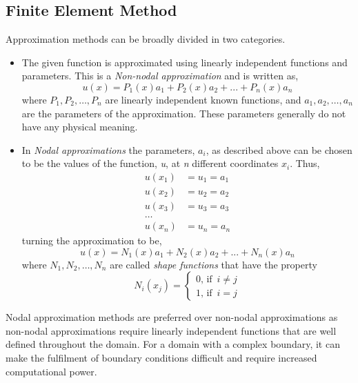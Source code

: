 \documentclass[../main.tex]{subfiles}
\begin{document}
\subsection{Finite Element Method}
Approximation methods can be broadly divided in two categories.
\begin{itemize}
    \item The given function is approximated using linearly independent functions and parameters. This is a \emph{Non-nodal approximation} and is written as,
    \begin{equation*}
        u(x) = P_{1}(x) a_{1} + P_{2}(x) a_{2} + ... + P_{n}(x) a_{n}
    \end{equation*}
    where $P_{1}, P_{2},\dots, P_{n}$ are linearly independent known functions, 
     and $a_{1}, a_{2},\dots, a_{n}$ are the parameters of the approximation. These parameters generally do not have any physical meaning.
    \item In \emph{Nodal approximations} the parameters, $a_{i}$, as described above can be chosen to be the values of the function, \emph{u}, at \emph{n} different coordinates $x_{i}$. Thus,
    \begin{align*}
        u(x_{1}) &= u_{1} = a_{1}\\
        u(x_{2}) &= u_{2} = a_{2}\\
        u(x_{3}) &= u_{3} = a_{3}\\
        \dots \\
        u(x_{n}) &= u_{n} = a_{n}
    \end{align*}   
    turning the approximation to be, 
    \begin{equation*}
        u(x) = N_{1}(x) a_{1} + N_{2}(x) a_{2} + ... + N_{n}(x) a_{n}
    \end{equation*}
    where $N_{1}, N_{2},\dots, N_{n}$ are called \emph{shape functions} that have the property
    \begin{equation*}
        N_{i}(x_{j}) = \begin{cases}
            0 \text{, if } \, i \neq j\\
            1 \text{, if } \, i = j
        \end{cases}
    \end{equation*}
\end{itemize}
Nodal approximation methods are preferred over non-nodal approximations as non-nodal approximations require
 linearly independent functions that are well defined throughout the domain. For a domain with a complex boundary,
 it can make the fulfilment of boundary conditions difficult and require increased computational power.
\end{document}
